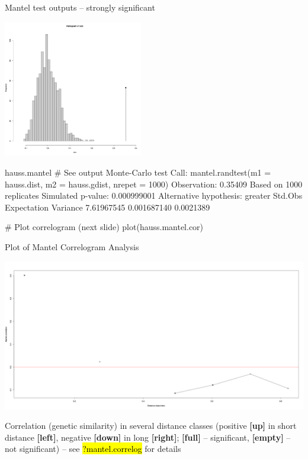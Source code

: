 \documentclass[compress, ucs, xelatex, 11pt, xcolor=svgnames,
  hyperref={
    bookmarks=true,
    unicode=true,
    colorlinks=true,
    pdftitle={Molecular data in R},
    plainpages=false,
    pdfauthor={Vojtech Zeisek},
    pdfsubject={Course about phylogeny and evolution in R},
    pdfcreator={XeLaTeX},
    pdfkeywords={R, evolution, phylogeny, molecular data},
    linkcolor=Tomato,
    anchorcolor=SaddleBrown,
    citecolor=Goldenrod,
    filecolor=DarkMagenta,
    menucolor=Sienna,
    urlcolor=DarkTurquoise,
    pdftex},
  url={hyphens, lowtilde} %
  ]{beamer}
\renewcommand{\texttt}[1]{\hl{\ttfamily #1}}
\begin{document}
\begin{frame}[fragile]{Mantel test outputs -- strongly significant}
\begin{multicols}{2}
  \includegraphics[height=6cm]{mantel.png}
  \begin{spluscode}
    hauss.mantel # See output
    Monte-Carlo test
    Call: mantel.randtest(m1 =
      hauss.dist, m2 =
      hauss.gdist, nrepet = 1000)
    Observation: 0.35409
    Based on 1000 replicates
    Simulated p-value: 0.000999001
    Alternative hypothesis: greater
      Std.Obs Expectation  Variance
    7.61967545 0.001687140 0.0021389
  \end{spluscode}
  \vfill
  \begin{spluscode}
    # Plot correlogram (next slide)
    plot(hauss.mantel.cor)
  \end{spluscode}
\end{multicols}
\end{frame}

\begin{frame}{Plot of Mantel Correlogram Analysis}
  \vfil
  \begin{center}
    \includegraphics[width=\textwidth-1cm]{mantel-cor.png}
  \end{center}
  \vfil
  Correlation (genetic similarity) in several distance classes (positive \textbf{[up]} in short distance \textbf{[left]}, negative \textbf{[down]} in long \textbf{[right]}; \textbf{[full]} -- significant, \textbf{[empty]} -- not significant) -- see \texttt{?mantel.correlog} for details
  \vfill
\end{frame}
\end{document}
